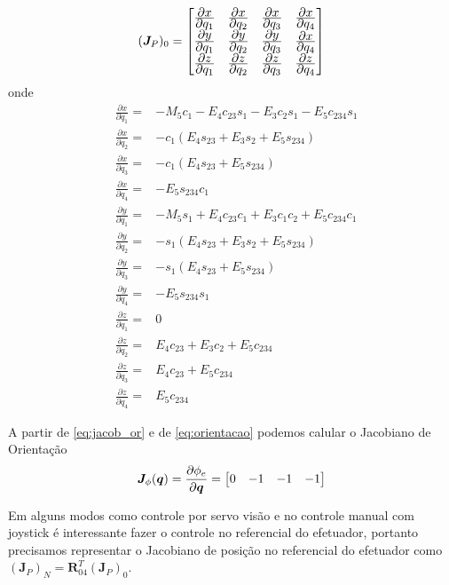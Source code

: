 \begin{equation}
(\bm{J}_P)_0 = 
\begin{bmatrix}
	\frac{\displaystyle \partial x}{\displaystyle \partial q_1} & \frac{\displaystyle \partial x}{\displaystyle \partial q_2} & \frac{\displaystyle \partial x}{\displaystyle \partial q_3} & \frac{\displaystyle \partial x}{\displaystyle \partial q_4}  \\
	\frac{\displaystyle \partial y}{\displaystyle \partial q_1} & \frac{\displaystyle \partial y}{\displaystyle \partial q_2} & \frac{\displaystyle \partial y}{\displaystyle \partial q_3} & \frac{\displaystyle \partial x}{\displaystyle \partial q_4}  \\
	\frac{\displaystyle \partial z}{\displaystyle \partial q_1} & \frac{\displaystyle \partial z}{\displaystyle \partial q_2} & \frac{\displaystyle \partial z}{\displaystyle \partial q_3} & \frac{\displaystyle \partial z}{\displaystyle \partial q_4}  \\
\end{bmatrix}
\end{equation}
onde
\begin{align*}
&\frac{\partial x}{\partial q_1} =& - M_5c_1 - E_4c_{23}s_1 - E_3c_2s_1 - E_5c_{234}s_1  \\
&\frac{\partial x}{\partial q_2} =& -c_1(E_4s_{23}+E_3s_2+E_5s_{234}) \\
&\frac{\partial x}{\partial q_3} =& -c_1(E_4s_{23}+E_5s_{234}) \\
&\frac{\partial x}{\partial q_4} =& -E_5s_{234}c_1 \\
&\frac{\partial y}{\partial q_1} =& -M_5s_1+E_4c_{23}c_1+E_3c_1c_2+E_5c_{234}c_1 \\
&\frac{\partial y}{\partial q_2} =& -s_1(E_4s_{23}+E_3s_2+E_5s_{234}) \\
&\frac{\partial y}{\partial q_3} =& -s_1(E_4s_{23}+E_5s_{234}) \\
&\frac{\partial y}{\partial q_4} =& -E_5s_{234}s_1 \\ 
&\frac{\partial z}{\partial q_1} =& 0 \\ 
&\frac{\partial z}{\partial q_2} =& E_4c_{23}+E_3c_2+E_5c_{234} \\
&\frac{\partial z}{\partial q_3} =& E_4c_{23}+E_5c_{234}\\
&\frac{\partial z}{\partial q_4} =& E_{5}c_{234} 
\end{align*}

A partir de \ref{eq:jacob_or} e de \ref{eq:orientacao} podemos calular o Jacobiano de Orientação
\begin{equation}
\bm{J}_{\phi}(\bm{q}) = \frac{\partial \phi_e}{\partial \bm{q}} = \begin{bmatrix}0 & -1 & -1 & -1\end{bmatrix}
\end{equation}
 
Em alguns modos como controle por servo visão e no controle manual com joystick é interessante fazer o controle no referencial do efetuador, portanto precisamos representar o Jacobiano de posição no referencial do efetuador como $(\bm{J}_P)_N = \bm{R}_{04}^T (\bm{J}_P)_0$.  

